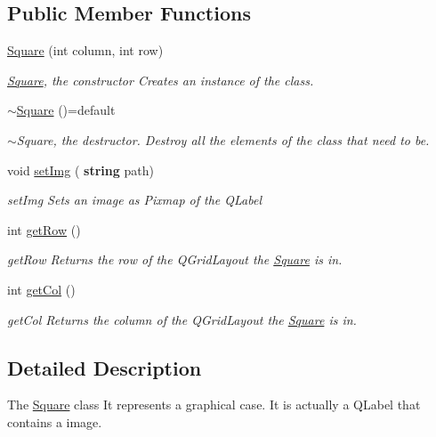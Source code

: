 \subsection*{Public Member Functions}
\begin{DoxyCompactItemize}
\item 
\hyperlink{class_square_a6fa43122d0022ee5553962b05bd8ecd4}{Square} (int column, int row)
\begin{DoxyCompactList}\small\item\em \hyperlink{class_square}{Square}, the constructor Creates an instance of the class. \end{DoxyCompactList}\item 
\mbox{\label{class_square_ab6c220a623d0d0f4793828063728dc10}} 
\hyperlink{class_square_ab6c220a623d0d0f4793828063728dc10}{$\sim$\+Square} ()=default
\begin{DoxyCompactList}\small\item\em $\sim$\+Square, the destructor. Destroy all the elements of the class that need to be. \end{DoxyCompactList}\item 
void \hyperlink{class_square_a7a7e3e8e985f790b9a28cb4f5a6dab7a}{set\+Img} (\textbf{ string} path)
\begin{DoxyCompactList}\small\item\em set\+Img Sets an image as Pixmap of the Q\+Label \end{DoxyCompactList}\item 
int \hyperlink{class_square_ad3391313a44cdbfbe87fd3ddc545feac}{get\+Row} ()
\begin{DoxyCompactList}\small\item\em get\+Row Returns the row of the Q\+Grid\+Layout the \hyperlink{class_square}{Square} is in. \end{DoxyCompactList}\item 
int \hyperlink{class_square_aaf011d4ff750d0770ba82b4c659c27f8}{get\+Col} ()
\begin{DoxyCompactList}\small\item\em get\+Col Returns the column of the Q\+Grid\+Layout the \hyperlink{class_square}{Square} is in. \end{DoxyCompactList}\end{DoxyCompactItemize}


\subsection{Detailed Description}
The \hyperlink{class_square}{Square} class It represents a graphical case. It is actually a Q\+Label that contains a image. 

